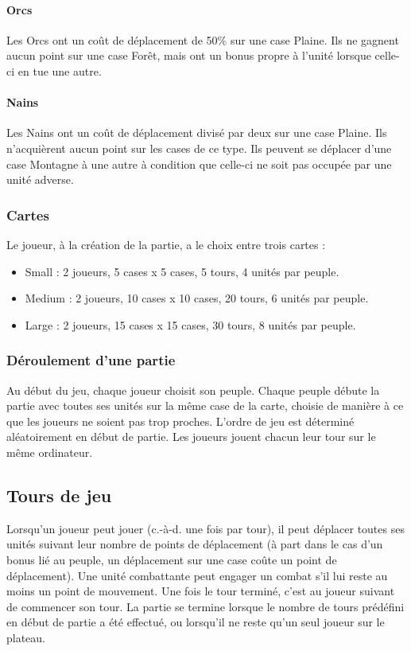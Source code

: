 \documentclass[a4paper]{article}
\begin{document}
\paragraph{Orcs} Les Orcs ont un coût de déplacement de 50\% sur une case Plaine. Ils ne gagnent aucun point sur une case Forêt, mais ont un bonus propre à l'unité lorsque celle-ci en tue une autre.
\paragraph{Nains} Les Nains ont un coût de déplacement divisé par deux sur une case Plaine. Ils n'acquièrent aucun point sur les cases de ce type. Ils peuvent se déplacer d'une case Montagne à une autre à condition que celle-ci ne soit pas occupée par une unité adverse.

		\subsubsection{Cartes}
		Le joueur, à la création de la partie, a le choix entre trois cartes :
		\begin{itemize}
			\item Small : 2 joueurs, 5 cases x 5 cases, 5 tours, 4 unités par peuple.
			\item Medium : 2 joueurs, 10 cases x 10 cases, 20 tours, 6 unités par peuple.
			\item Large : 2 joueurs, 15 cases x 15 cases, 30 tours, 8 unités par peuple.
		\end{itemize}

		\subsubsection{Déroulement d'une partie}
		Au début du jeu, chaque joueur choisit son peuple. Chaque peuple débute la partie avec toutes ses unités sur la même case de la carte, choisie de manière à ce que les joueurs ne soient pas trop proches. L’ordre de jeu est déterminé aléatoirement en début de partie. Les joueurs jouent chacun leur tour sur le même ordinateur.

	\subsection{Tours de jeu}
	Lorsqu’un joueur peut jouer (c.-à-d. une fois par tour), il peut déplacer toutes ses unités suivant leur nombre de points de déplacement (à part dans le cas d'un bonus lié au peuple, un déplacement sur une case coûte un point de déplacement). Une unité combattante peut engager un combat s’il lui reste au moins un point de mouvement. Une fois le tour terminé, c’est au joueur suivant de commencer son tour. La partie se termine lorsque le nombre de tours prédéfini en début de partie a été effectué, ou lorsqu’il ne reste qu’un seul joueur sur le plateau.
\end{document}
